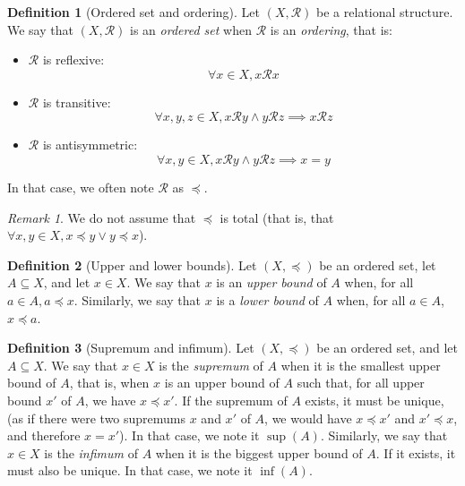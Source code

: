 \documentclass{article}
\theoremstyle{definition}
\newtheorem{definition}{Definition}[section]
\theoremstyle{remark}
\newtheorem*{remark}{Remark}
\theoremstyle{example}
\theoremstyle{notation}
\theoremstyle{axiom}
\begin{document}
\begin{definition}[Ordered set and ordering] %
		Let $(X, \mathcal{R})$ be a relational structure. We say that $(X, \mathcal{R})$ is an \textit{ordered set} when $\mathcal{R}$ is an \textit{ordering}, that is:
		\begin{itemize}
				\item $\mathcal{R}$ is reflexive:
						$$\forall x \in X, x \mathcal{R} x$$
				\item $\mathcal{R}$ is transitive:
						$$\forall x, y, z \in X, x \mathcal{R} y \land y \mathcal{R} z \implies x \mathcal{R} z$$
				\item $\mathcal{R}$ is antisymmetric:
						$$\forall x, y \in X, x \mathcal{R} y \land y \mathcal{R} z \implies x = y$$
		\end{itemize}
		In that case, we often note $\mathcal{R}$ as $\preceq$.
\end{definition}

\begin{remark}
		We do not assume that $\preceq$ is total (that is, that $\forall x, y \in X, x \preceq y \lor y \preceq x$).
\end{remark}

\begin{definition}[Upper and lower bounds]
		Let $(X, \preceq)$ be an ordered set, let $A \subseteq X$, and let $x \in X$. We say that $x$ is an \textit{upper bound} of $A$ when, for all $a \in A, a \preceq x$. Similarly, we say that $x$ is a \textit{lower bound} of $A$ when, for all $a \in A$, $x \preceq a$.
\end{definition}

\begin{definition}[Supremum and infimum] %
		Let $(X, \preceq)$ be an ordered set, and let $A \subseteq X$. We say that $x \in X$ is the \textit{supremum} of $A$ when it is the smallest upper bound of $A$, that is, when $x$ is an upper bound of $A$ such that, for all upper bound $x'$ of $A$, we have $x \preceq x'$. If the supremum of $A$ exists, it must be unique, (as if there were two supremums $x$ and $x'$ of $A$, we would have $x \preceq x'$ and $x' \preceq x$, and therefore $x = x'$). In that case, we note it $\sup(A)$. Similarly, we say that $x \in X$ is the \textit{infimum} of $A$ when it is the biggest upper bound of $A$. If it exists, it must also be unique. In that case, we note it $\inf(A)$.
\end{definition}
\end{document}
